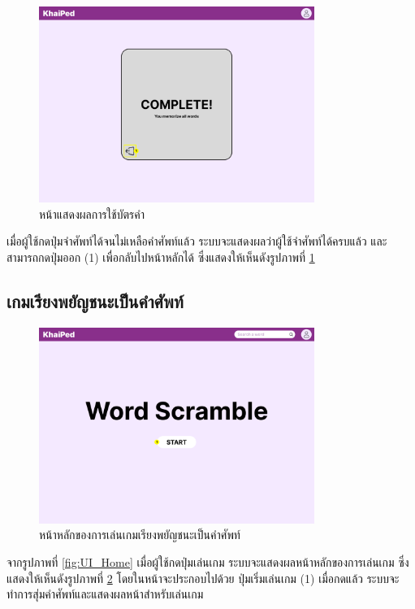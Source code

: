 \documentclass[12pt,oneside,openright,a4paper]{cpe-thai-project}
\begin{document}
\begin{figure}[!h]\centering
	\includegraphics[width=0.8\textwidth, keepaspectratio=true]{image/chap3/ui/flashcard/Flashcard - Complete.png}
	\caption{หน้าแสดงผลการใช้บัตรคำ}\label{fig:UI_FlashcardResult}
\end{figure}
\hspace{1cm}
เมื่อผู้ใช้กดปุ่มจำศัพท์ได้จนไม่เหลือคำศัพท์แล้ว ระบบจะแสดงผลว่าผู้ใช้จำศัพท์ได้ครบแล้ว และสามารถกดปุ่มออก (1) เพื่อกลับไปหน้าหลักได้ ซึ่งแสดงให้เห็นดังรูปภาพที่ \ref{fig:UI_FlashcardResult}

\pagebreak
\subsection{เกมเรียงพยัญชนะเป็นคำศัพท์}
\begin{figure}[!h]\centering
	\includegraphics[width=0.8\textwidth, keepaspectratio=true]{image/chap3/ui/game/Word Scramble.png}
	\caption{หน้าหลักของการเล่นเกมเรียงพยัญชนะเป็นคำศัพท์}\label{fig:UI_Game}
\end{figure}
\hspace{1cm}
จากรูปภาพที่ \ref{fig:UI_Home} เมื่อผู้ใช้กดปุ่มเล่นเกม ระบบจะแสดงผลหน้าหลักของการเล่นเกม ซึ่งแสดงให้เห็นดังรูปภาพที่ \ref{fig:UI_Game} โดยในหน้าจะประกอบไปด้วย
ปุ่มเริ่มเล่นเกม (1) เมื่อกดแล้ว ระบบจะทำการสุ่มคำศัพท์และแสดงผลหน้าสำหรับเล่นเกม
\end{document}
